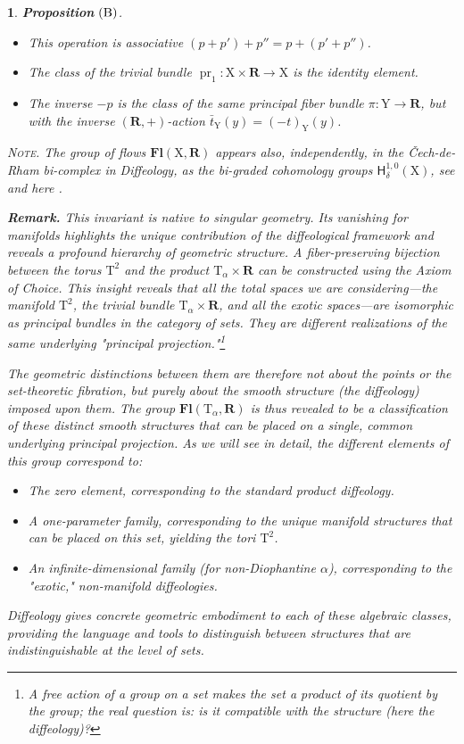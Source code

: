 \documentclass[10pt,letterpaper,reqno]{amsart}
\theoremstyle{article}
\newtheorem{article}[subsection]{}
\newenvironment{proposition}[1][]{\textbf{Proposition} $\left(\hbox{#1}\right)$.\it}{}
\newcommand{\1}{{\hat 1}}
\newcommand{\0}{{\hat 0}}
\newcommand{\RR}{\mathbf R}
\newcommand{\sfbH}{{\boldsymbol{\mathsf H}}}
\newcommand{\HG}{\sfbH}
\def \T{\mathrm T}
\def \X{\mathrm X}
\def \Y{\mathrm Y}
\DeclareMathOperator{\Fb}{\boldsymbol{\mathsf{Fl}}}
\newcommand{\pr}{\operatorname{pr}}
\renewcommand{\Fb}{\mathbf{Fl}}
\begin{document}
\begin{article}
\begin{proposition}[B]
\begin{itemize}
        \item[(b)] This operation is associative $(p+p')+p'' = p+(p'+p'')$.
        
        \item[(c)] The class of the trivial bundle $\pr_1 : \X \times \RR \to \X$ is the identity element.
        
        \item[(d)] The inverse $-p$ is the class of the same principal fiber bundle $\pi : \Y \to \RR$,
        but with the inverse $(\RR,+)$-action $\bar t_\Y(y) = (-t)_\Y(y)$.
      \end{itemize}
    \end{proposition}
    
    \textsc{Note.}  The group of flows $\Fb(\X,\RR)$ appears also,
    independently,
    in the \emph{\v{C}ech-de-Rham bi-complex in Diffeology},
    as the bi-graded cohomology groups $\HG_\delta^{1,0}(\X)$,
    see \cite[]{PIZ24} and here \cite{PIZ88}.
    
    \textbf{Remark.}
      This invariant is native to singular geometry. Its vanishing for manifolds highlights the unique contribution of the diffeological framework and reveals a profound hierarchy of geometric structure. A fiber-preserving bijection between the torus $\T^2$ and the product $\T_\alpha \times \RR$ can be constructed using the Axiom of Choice. This insight reveals that all the total spaces we are considering---the manifold $\T^2$, the trivial bundle $\T_\alpha \times \RR$, and all the exotic spaces---are isomorphic as principal bundles in the category of sets. They are different realizations of the same underlying "principal projection."\footnote{A free action of a group on a set makes the set a product of its quotient by the group; the real question is: is it compatible with the structure (here the diffeology)?}
      
      The geometric distinctions between them are therefore not about the points or the set-theoretic fibration, but purely about the \emph{smooth structure} (the diffeology) imposed upon them. The group $\Fb(\T_\alpha, \RR)$ is thus revealed to be a classification of these distinct smooth structures that can be placed on a single, common underlying principal projection. As we will see in detail, the different elements of this group correspond to:
      \begin{itemize}
        \item[--] The zero element, corresponding to the standard product diffeology.
        \item[--] A one-parameter family, corresponding to the unique \emph{manifold} structures that can be placed on this set, yielding the tori $\T^2$.
        \item[--] An infinite-dimensional family (for non-Diophantine $\alpha$), corresponding to the "exotic," non-manifold diffeologies.
      \end{itemize}
      Diffeology gives concrete geometric embodiment to each of these algebraic classes, providing the language and tools to distinguish between structures that are indistinguishable at the level of sets.


\end{article}
\end{document}
